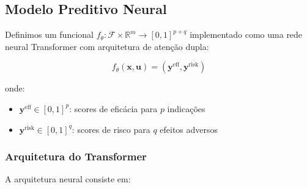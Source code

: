 \documentclass[12pt, a4paper]{article}
\begin{document}
\subsection{Modelo Preditivo Neural}

Definimos um funcional $f_\theta: \mathcal{F} \times \mathbb{R}^m \to [0,1]^{p+q}$ implementado como uma rede neural Transformer com arquitetura de atenção dupla:

\begin{equation}
f_\theta(\mathbf{x}, \mathbf{u}) = (\mathbf{y}^{\text{eff}}, \mathbf{y}^{\text{risk}})
\end{equation}

onde:
\begin{itemize}
    \item $\mathbf{y}^{\text{eff}} \in [0,1]^p$: scores de eficácia para $p$ indicações
    \item $\mathbf{y}^{\text{risk}} \in [0,1]^q$: scores de risco para $q$ efeitos adversos
\end{itemize}

\subsubsection{Arquitetura do Transformer}

A arquitetura neural consiste em:
\end{document}
